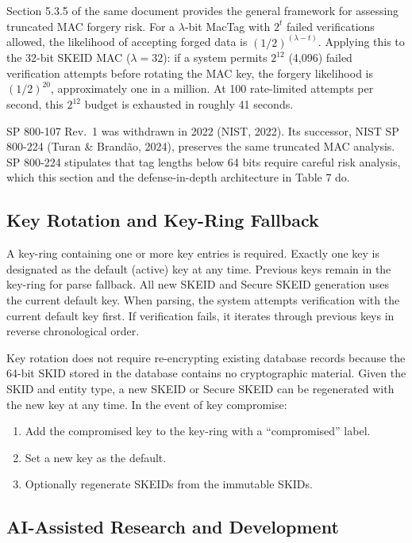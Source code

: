 \documentclass[fleqn,10pt,lineno]{wlpeerj}
\providecommand{\tightlist}{%
  \setlength{\itemsep}{0pt}\setlength{\parskip}{0pt}}
\begin{document}
Section 5.3.5 of the same document provides the general framework for
assessing truncated MAC forgery risk. For a \(\lambda\)-bit MacTag with
\(2^t\) failed verifications allowed, the likelihood of accepting forged
data is \((1/2)^{(\lambda - t)}\). Applying this to the 32-bit SKEID MAC
(\(\lambda = 32\)): if a system permits \(2^{12}\) (4,096) failed
verification attempts before rotating the MAC key, the forgery
likelihood is \((1/2)^{20}\), approximately one in a million. At 100
rate-limited attempts per second, this \(2^{12}\) budget is exhausted in
roughly 41 seconds.

SP 800-107 Rev.~1 was withdrawn in 2022 (NIST, 2022). Its successor,
NIST SP 800-224 (Turan \& Brandão, 2024), preserves the same truncated
MAC analysis. SP 800-224 stipulates that tag lengths below 64 bits
require careful risk analysis, which this section and the
defense-in-depth architecture in Table 7 do.

\subsection{Key Rotation and Key-Ring
Fallback}\label{key-rotation-and-key-ring-fallback}

A key-ring containing one or more key entries is required. Exactly one
key is designated as the default (active) key at any time. Previous keys
remain in the key-ring for parse fallback. All new SKEID and Secure
SKEID generation uses the current default key. When parsing, the system
attempts verification with the current default key first. If
verification fails, it iterates through previous keys in reverse
chronological order.

Key rotation does not require re-encrypting existing database records
because the 64-bit SKID stored in the database contains no cryptographic
material. Given the SKID and entity type, a new SKEID or Secure SKEID
can be regenerated with the new key at any time. In the event of key
compromise:

\begin{enumerate}
\def\labelenumi{\arabic{enumi}.}
\tightlist
\item
  Add the compromised key to the key-ring with a ``compromised'' label.
\item
  Set a new key as the default.
\item
  Optionally regenerate SKEIDs from the immutable SKIDs.
\end{enumerate}

\subsection{AI-Assisted Research and
Development}\label{ai-assisted-research-and-development}
\end{document}
